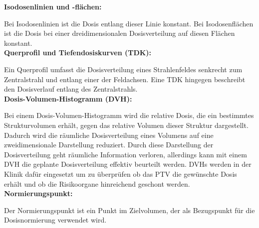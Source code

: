 \textbf{Isodosenlinien und -flächen:}

Bei Isodosenlinien ist die Dosis entlang dieser Linie konstant. Bei Isodosenflächen
ist die Dosis bei einer dreidimensionalen Dosisverteilung auf diesen Flächen konstant. \cite{grundlagen}\\

\textbf{Querprofil und Tiefendosiskurven (TDK):}

Ein Querprofil umfasst die Dosisverteilung eines Strahlenfeldes senkrecht zum Zentralstrahl und entlang einer
der Feldachsen. Eine TDK hingegen beschreibt den Dosisverlauf entlang des Zentralstrahls. \cite{grundlagen}\\

\textbf{Dosis-Volumen-Histogramm (DVH):}

Bei einem Dosis-Volumen-Histogramm wird die relative Dosis, die ein bestimmtes
Strukturvolumen erhält, gegen das relative Volumen dieser Struktur
dargestellt. Dadurch wird die räumliche Dosisverteilung eines Volumens auf
eine zweidimensionale Darstellung reduziert. Durch diese Darstellung der
Dosisverteilung geht räumliche Information verloren, allerdings kann mit
einem DVH die geplante Dosisverteilung effektiv beurteilt werden.
DVHs werden in der Klinik dafür eingesetzt um zu überprüfen ob das
PTV die gewünschte Dosis erhält und ob die Risikoorgane hinreichend geschont
werden. \cite{grundlagen}\\

\textbf{Normierungspunkt:}

Der Normierungspunkt ist ein Punkt im Zielvolumen, der als Bezugspunkt für die
Dosisnormierung verwendet wird. \cite{grundlagen}

\newpage
